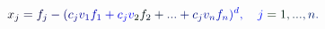 \documentclass[12pt]{article}
\begin{document}
\makeatletter
\renewcommand*{\@textcolor}[3]{%
  \protect\leavevmode
  \begingroup
    \color#1{#2}#3%
  \endgroup
}
\makeatother
\begin{displaymath}
\mathcolor[RGB]{0,0,15}{x} _ { \mathcolor[RGB]{0,0,30}{j} } \mathcolor[RGB]{0,0,45}{=} \mathcolor[RGB]{0,0,60}{f} _ { \mathcolor[RGB]{0,0,75}{j} } \mathcolor[RGB]{0,0,90}{-} \mathcolor[RGB]{0,0,105}{(} \mathcolor[RGB]{0,0,120}{c} _ { \mathcolor[RGB]{0,0,135}{j} } \mathcolor[RGB]{0,0,150}{v} _ { \mathcolor[RGB]{0,0,165}{1} } \mathcolor[RGB]{0,0,180}{f} _ { \mathcolor[RGB]{0,0,195}{1} } \mathcolor[RGB]{0,0,210}{+} \mathcolor[RGB]{0,0,225}{c} _ { \mathcolor[RGB]{0,0,240}{j} } \mathcolor[RGB]{0,0,255}{v} _ { \mathcolor[RGB]{0,15,0}{2} } \mathcolor[RGB]{0,15,15}{f} _ { \mathcolor[RGB]{0,15,30}{2} } \mathcolor[RGB]{0,15,45}{+} \mathcolor[RGB]{0,15,60}{.} \mathcolor[RGB]{0,15,75}{.} \mathcolor[RGB]{0,15,90}{.} \mathcolor[RGB]{0,15,105}{+} \mathcolor[RGB]{0,15,120}{c} _ { \mathcolor[RGB]{0,15,135}{j} } \mathcolor[RGB]{0,15,150}{v} _ { \mathcolor[RGB]{0,15,165}{n} } \mathcolor[RGB]{0,15,180}{f} _ { \mathcolor[RGB]{0,15,195}{n} } \mathcolor[RGB]{0,15,210}{)} ^ { \mathcolor[RGB]{0,15,225}{d} } \mathcolor[RGB]{0,15,240}{,} \quad \mathcolor[RGB]{0,15,255}{j} \mathcolor[RGB]{0,30,0}{=} \mathcolor[RGB]{0,30,15}{1} \mathcolor[RGB]{0,30,30}{,} \mathcolor[RGB]{0,30,45}{.} \mathcolor[RGB]{0,30,60}{.} \mathcolor[RGB]{0,30,75}{.} \mathcolor[RGB]{0,30,90}{,} \mathcolor[RGB]{0,30,105}{n} \mathcolor[RGB]{0,30,120}{.}
\end{displaymath}
\end{document}
